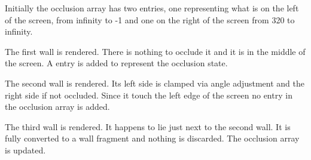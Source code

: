 Initially the occlusion array has two entries, one representing what is on the left of the screen, from infinity to -1 and one on the right of the screen from 320 to infinity.
\par 
\begin{minipage}{0.54\textwidth}
\vspace*{2.5mm}
\end{minipage}
\begin{minipage}{0.46\textwidth}
\end{minipage}
\par






The first wall is rendered. There is nothing to occlude it and it is in the middle of the screen. A entry is added to represent the occlusion state.
\par
\begin{minipage}{0.54\textwidth}
\vspace*{2.5mm}
\end{minipage}
\begin{minipage}{0.46\textwidth}
\centering
{}
\end{minipage}
\par



The second wall is rendered. Its left side is clamped via angle adjustment and the right side if not occluded. Since it touch the left edge of the screen no entry in the occlusion array is added.
\par
\begin{minipage}{0.54\textwidth}
\vspace*{2.5mm}
\end{minipage}
\begin{minipage}{0.45\textwidth}
\centering
{}
\end{minipage}
\par





The third wall is rendered. It happens to lie just next to the second wall. It is fully converted to a wall fragment and nothing is discarded. The occlusion array is updated.
\begin{minipage}{0.54\textwidth}
\vspace*{2.5mm}
\end{minipage}
\begin{minipage}{0.46\textwidth}
\centering
{}
\end{minipage}
\par


